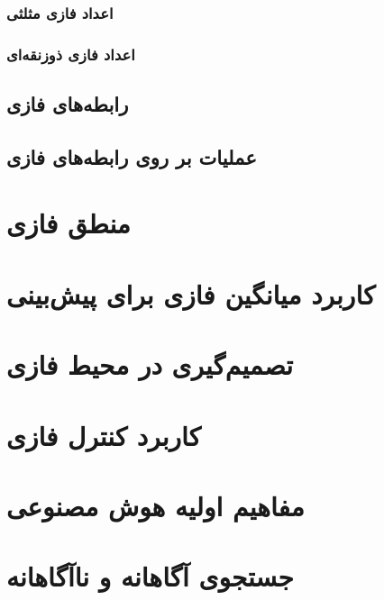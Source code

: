 \documentclass[12pt,a4paper]{article}
\theoremstyle{definition}
\begin{document}
  \subsubsection{‌اعداد فازی مثلثی}
  \subsubsection{‌اعداد فازی ذوزنقه‌ای}
 \subsection{رابطه‌های فازی}
 \subsection{عملیات بر روی رابطه‌های فازی}
\section{منطق فازی}
\section{کاربرد میانگین فازی برای پیش‌بینی}
\section{تصمیم‌گیری در محیط فازی}
\section{کاربرد کنترل فازی}
\section{مفاهیم اولیه هوش مصنوعی}
\section{جستجوی آگاهانه و ناآگاهانه}


\end{document}
